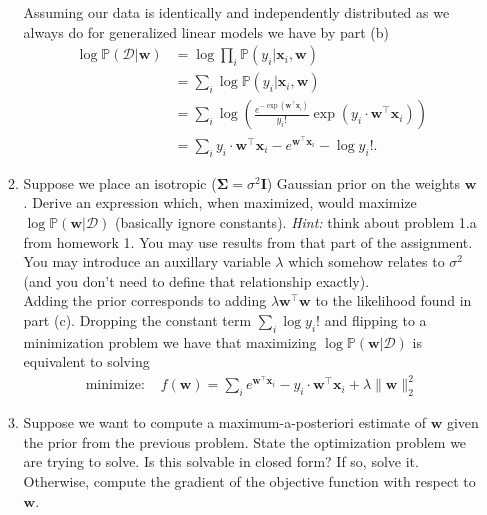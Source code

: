 \documentclass[letter, 12pt]{article}
\begin{document}
\begin{enumerate}
\begin{enumerate}
            Assuming our data is identically and independently distributed as we always do for
            generalized linear models we have by part (b)
            \begin{align*}
                \log\mathbb{P}(\mathcal{D}|\mathbf{w}) &= \log\prod_i \mathbb{P}(y_i | \mathbf{x}_i,\mathbf{w})\\
                &= \sum_i\log\mathbb{P}(y_i|\mathbf{x}_i,\mathbf{w})\\
                &= \sum_i\log\left(\frac{e^{-\exp(\mathbf{w}^\top\mathbf{x}_i)}}{y_i!}\exp\left(y_i\cdot\mathbf{w}^\top\mathbf{x}_i\right)\right)\\
                &= \sum_i y_i\cdot \mathbf{w}^\top\mathbf{x}_i - e^{\mathbf{w}^\top\mathbf{x}_i} - \log y_i!.
            \end{align*}
            \vfill
        \item Suppose we place an isotropic ($\mathbf\Sigma = \sigma^2\mathbf{I}$)
            Gaussian prior on the weights $\mathbf{w}$. Derive an expression which, when
            maximized, would maximize
            $\log\mathbb{P}(\mathbf{w}|\mathcal{D})$ (basically ignore constants).
            \textit{Hint:} think about problem
            1.a from homework 1. You may use results from that part of the assignment.
            You may introduce an auxillary variable $\lambda$ which somehow relates
            to $\sigma^2$ (and you don't need to define that relationship exactly).\\[1em]
            Adding the prior corresponds to adding $\lambda\mathbf{w}^\top\mathbf{w}$ to the
            likelihood found in part (c). Dropping the constant term $\sum_i \log y_i!$ and
            flipping to a minimization problem we have
            that maximizing $\log\mathbb{P}(\mathbf{w}|\mathcal{D})$ is equivalent to solving
            \begin{align*}
                \text{minimize: } & f(\mathbf{w}) = \sum_i e^{\mathbf{w}^\top\mathbf{x}_i} - y_i\cdot \mathbf{w}^\top\mathbf{x}_i + \lambda\|\mathbf{w}\|_2^2
            \end{align*}
            \vfill
        \item Suppose we want to compute a maximum-a-posteriori estimate of $\mathbf{w}$
            given the prior from the previous problem. State the optimization problem
            we are trying to solve. Is this solvable in closed form? If so, solve it.
            Otherwise, compute the gradient of the objective function with respect
            to $\mathbf{w}$.\\[1em]

\end{enumerate}
\end{enumerate}
\end{document}
